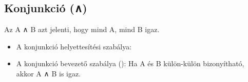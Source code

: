 \subsection{Konjunkció (∧)}
Az A ∧ B azt jelenti, hogy mind A, mind B igaz.
\begin{code}%
%
\>[6]%
\>[12]\AgdaSymbol{:}\AgdaSpace{}%
\AgdaSymbol{\}}\AgdaSpace{}%
\AgdaSpace{}%
\AgdaSpace{}%
\AgdaSpace{}%
\AgdaSpace{}%
\AgdaSpace{}%
\AgdaSpace{}%
\AgdaSpace{}%
\AgdaSpace{}%
\<%
\end{code}

\begin{itemize}
\item A konjunkció helyettesítési szabálya:
\begin{code}%
%
\>[6]%
\>[12]\AgdaSymbol{:}\AgdaSpace{}%
\AgdaSpace{}%
\AgdaSpace{}%
\AgdaSpace{}%
\AgdaSymbol{\}\{}\AgdaSpace{}%
\AgdaSymbol{:}\AgdaSpace{}%
\AgdaSpace{}%
\AgdaSpace{}%
\AgdaSymbol{\}}\AgdaSpace{}%
\AgdaSpace{}%
\AgdaSymbol{(}\AgdaSpace{}%
\AgdaSpace{}%
\AgdaSymbol{)}\AgdaSpace{}%
\AgdaOperator{\AgdaField{[}}\AgdaSpace{}%
\AgdaSpace{}%
\AgdaOperator{\AgdaField{]ᶠ}}\AgdaSpace{}%
\AgdaSpace{}%
\AgdaSpace{}%
\AgdaOperator{\AgdaField{[}}\AgdaSpace{}%
\AgdaSpace{}%
\AgdaOperator{\AgdaField{]ᶠ}}\AgdaSpace{}%
\AgdaSpace{}%
\AgdaSpace{}%
\AgdaOperator{\AgdaField{[}}\AgdaSpace{}%
\AgdaSpace{}%
\AgdaOperator{\AgdaField{]ᶠ}}\<%
\end{code}
\item A konjunkció bevezető szabálya (): Ha A és B külön-külön bizonyítható, akkor A ∧ B is igaz.
\begin{code}%
%
\>[6]%
\>[12]\AgdaSymbol{:}\AgdaSpace{}%
\AgdaSpace{}%
\AgdaSpace{}%
\AgdaSymbol{\}}\AgdaSpace{}%
\AgdaSpace{}%
\AgdaSpace{}%
\AgdaSpace{}%
\AgdaSpace{}%
\AgdaSpace{}%
\AgdaSpace{}%
\AgdaSpace{}%
\AgdaSpace{}%
\AgdaSpace{}%

\end{code}
\end{itemize}
